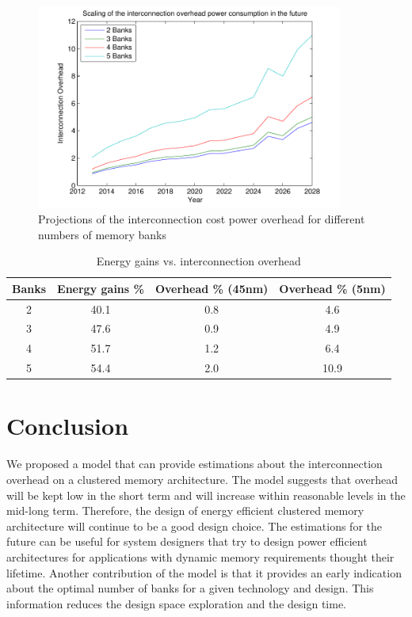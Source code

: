  \begin{figure}
 \centering
 \includegraphics[width = 0.9\textwidth]{E/overhead.pdf}
  \caption{Projections of the interconnection cost power overhead for different numbers of memory banks}
 \label{fig:overheadE}
 \end{figure} 

\begin{center}
	\begin{table}
	\caption{Energy gains vs. interconnection overhead}
	\label{tab:GainvsOverhead}
	{
	\begin{tabular}{|c|c|c|c|}
	\hline
	Banks & Energy gains \% & Overhead \% (45nm) & Overhead \% (5nm) \\
	\hline
	2 & 40.1  & 0.8 & 4.6 \\
	\hline 
	3 & 47.6  & 0.9 & 4.9 \\
	\hline 
	4 & 51.7 & 1.2 & 6.4 \\
	\hline
	5 & 54.4 & 2.0 & 10.9 \\
	\hline	
	\end{tabular}}
	\end{table}
\end{center}
  
\section{Conclusion}
\label{conclusionE}

We proposed a model that can provide estimations about the interconnection overhead on a clustered memory architecture.
The model suggests that overhead will be kept low in the short term and will increase within reasonable levels in the mid-long term.
Therefore, the design of energy efficient clustered memory architecture will continue to be a good design choice.
The estimations for the future can be useful for system designers that try to design power efficient architectures for applications with dynamic memory requirements thought their lifetime.
Another contribution of the model is that it provides an early indication about the optimal number of banks for a given technology and design.
This information reduces the design space exploration and the design time. 




%
